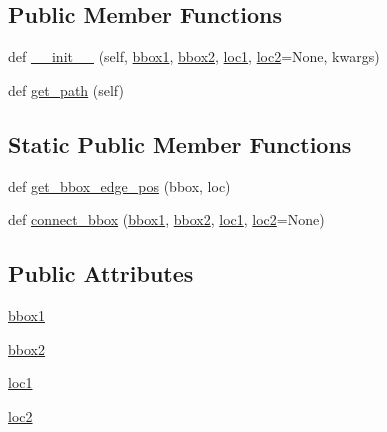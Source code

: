 \subsection*{Public Member Functions}
\begin{DoxyCompactItemize}
\item 
def \hyperlink{classaxes__grid1_1_1inset__locator_1_1BboxConnector_a56f662a15b658a20f6f7f57f92e5cd61}{\+\_\+\+\_\+init\+\_\+\+\_\+} (self, \hyperlink{classaxes__grid1_1_1inset__locator_1_1BboxConnector_a63b35233dec9f318cdc800f53aef552b}{bbox1}, \hyperlink{classaxes__grid1_1_1inset__locator_1_1BboxConnector_aaa2486406736d2f2229ef0ac71b49c30}{bbox2}, \hyperlink{classaxes__grid1_1_1inset__locator_1_1BboxConnector_a84f73654fc1b2813e5b96ed9bd18f99a}{loc1}, \hyperlink{classaxes__grid1_1_1inset__locator_1_1BboxConnector_a9cc580b84dc66cb96c1e83e188c333dd}{loc2}=None, kwargs)
\item 
def \hyperlink{classaxes__grid1_1_1inset__locator_1_1BboxConnector_a109f4a733678e9b9a8e7f582620e25dd}{get\+\_\+path} (self)
\end{DoxyCompactItemize}
\subsection*{Static Public Member Functions}
\begin{DoxyCompactItemize}
\item 
def \hyperlink{classaxes__grid1_1_1inset__locator_1_1BboxConnector_a8b9c83ac1587056f410d778f033066d4}{get\+\_\+bbox\+\_\+edge\+\_\+pos} (bbox, loc)
\item 
def \hyperlink{classaxes__grid1_1_1inset__locator_1_1BboxConnector_aa5d537ab370e903d69d7644bba202414}{connect\+\_\+bbox} (\hyperlink{classaxes__grid1_1_1inset__locator_1_1BboxConnector_a63b35233dec9f318cdc800f53aef552b}{bbox1}, \hyperlink{classaxes__grid1_1_1inset__locator_1_1BboxConnector_aaa2486406736d2f2229ef0ac71b49c30}{bbox2}, \hyperlink{classaxes__grid1_1_1inset__locator_1_1BboxConnector_a84f73654fc1b2813e5b96ed9bd18f99a}{loc1}, \hyperlink{classaxes__grid1_1_1inset__locator_1_1BboxConnector_a9cc580b84dc66cb96c1e83e188c333dd}{loc2}=None)
\end{DoxyCompactItemize}
\subsection*{Public Attributes}
\begin{DoxyCompactItemize}
\item 
\hyperlink{classaxes__grid1_1_1inset__locator_1_1BboxConnector_a63b35233dec9f318cdc800f53aef552b}{bbox1}
\item 
\hyperlink{classaxes__grid1_1_1inset__locator_1_1BboxConnector_aaa2486406736d2f2229ef0ac71b49c30}{bbox2}
\item 
\hyperlink{classaxes__grid1_1_1inset__locator_1_1BboxConnector_a84f73654fc1b2813e5b96ed9bd18f99a}{loc1}
\item 
\hyperlink{classaxes__grid1_1_1inset__locator_1_1BboxConnector_a9cc580b84dc66cb96c1e83e188c333dd}{loc2}
\end{DoxyCompactItemize}
